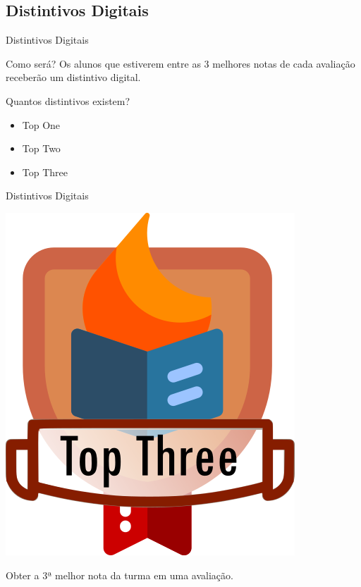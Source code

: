 \documentclass[xcolor=dvipsnames,table]{beamer}
\begin{document}
	\subsection{Distintivos Digitais}
	\begin{frame}{Distintivos Digitais}
		\begin{block}{Como será?}
			Os alunos que estiverem entre as 3 melhores notas de cada avaliação receberão um distintivo digital.
		\end{block} \pause
		\begin{block}{Quantos distintivos existem?}
			\begin{itemize}
				\item {\sc Top One}
				\item {\sc Top Two}
				\item {\sc Top Three}
			\end{itemize}
		\end{block}
	\end{frame}
	
	\begin{frame}{Distintivos Digitais}
		\begin{block}{}
			\begin{center}
				\includegraphics[height=.65\textheight]{images/badges/top-three.png}
			\end{center}		
			Obter a 3ª melhor nota da turma em uma avaliação. 
		\end{block}
	\end{frame}
\end{document}
